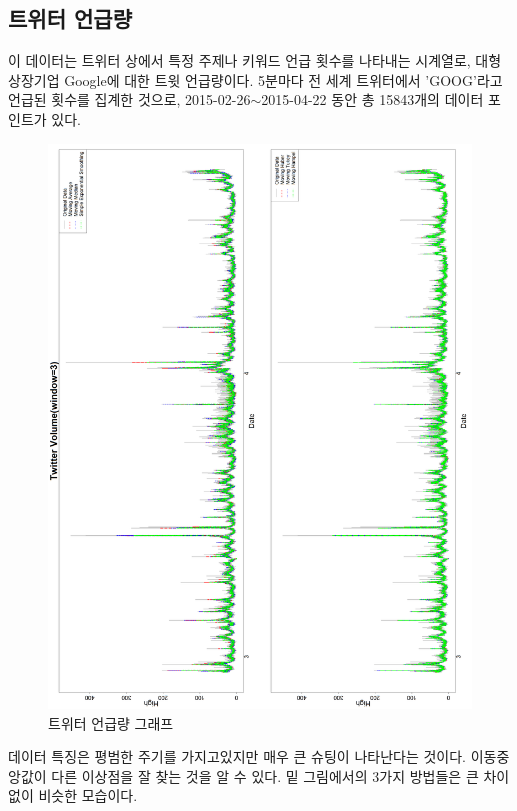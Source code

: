 \documentclass[letterpaper,12pt]{article}
\begin{document}
{\subsection{트위터 언급량}\label{subsec:TBM}
이 데이터는 트위터 상에서 특정 주제나 키워드 언급 횟수를 나타내는 시계열로, 대형 상장기업 Google에 대한 트윗 언급량이다. 5분마다 전 세계 트위터에서 'GOOG'라고 언급된 횟수를 집계한 것으로, 2015-02-26$\sim$2015-04-22 동안 총 15843개의 데이터 포인트가 있다.
\begin{figure}[H]
    \centering
    \includegraphics[width=1\linewidth]{figures/tw_3_1.png}
    \caption{트위터 언급량 그래프}
    \label{fig:enter-label}
\end{figure}
데이터 특징은 평범한 주기를 가지고있지만 매우 큰 슈팅이 나타난다는 것이다. 이동중앙값이 다른 이상점을 잘 찾는 것을 알 수 있다. 밑 그림에서의 3가지 방법들은 큰 차이 없이 비슷한 모습이다.


\clearpage
}
\end{document}

